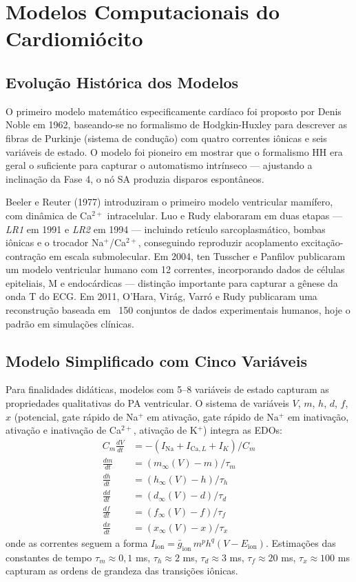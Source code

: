 \section{Modelos Computacionais do Cardiomiócito}
\label{sec:12-modelos}

\subsection{Evolução Histórica dos Modelos}
\label{sub:image12-modelos-hist}

O primeiro modelo matemático especificamente cardíaco foi proposto por
Denis Noble em 1962, baseando-se no formalismo de Hodgkin-Huxley para
descrever as fibras de Purkinje (sistema de condução) com quatro correntes
iônicas e seis variáveis de estado. O modelo foi pioneiro em mostrar que o
formalismo HH era geral o suficiente para capturar o automatismo
intrínseco --- ajustando a inclinação da Fase 4, o nó SA produzia
disparos espontâneos.

Beeler e Reuter (1977) introduziram o primeiro modelo ventricular
mamífero, com dinâmica de Ca$^{2+}$ intracelular. Luo e Rudy
elaboraram em duas etapas --- \emph{LR1} em 1991 e \emph{LR2} em 1994 ---
incluindo retículo sarcoplasmático, bombas iônicas e o trocador
Na$^+$/Ca$^{2+}$, conseguindo reproduzir acoplamento
excitação-contração em escala submolecular. Em 2004, ten Tusscher e
Panfilov publicaram um modelo ventricular humano com 12 correntes,
incorporando dados de células epiteliais, M e endocárdicas --- distinção
importante para capturar a gênese da onda T do ECG. Em 2011, O'Hara, Virág,
Varró e Rudy publicaram uma reconstrução baseada em ~150 conjuntos de
dados experimentais humanos, hoje o padrão em simulações clínicas.

\subsection{Modelo Simplificado com Cinco Variáveis}
\label{sub:image12-modelo-simples}

Para finalidades didáticas, modelos com 5--8 variáveis de estado capturam
as propriedades qualitativas do PA ventricular. O sistema de variáveis
$V$, $m$, $h$, $d$, $f$, $x$ (potencial, gate rápido de Na$^+$ em
ativação, gate rápido de Na$^+$ em inativação, ativação e inativação de
Ca$^{2+}$, ativação de K$^+$) integra as EDOs:
\begin{align}
C_m \frac{dV}{dt} &= -(I_{\mathrm{Na}} + I_{\mathrm{Ca},L} + I_K)/C_m \\
\frac{dm}{dt} &= (m_\infty(V) - m)/\tau_m \\
\frac{dh}{dt} &= (h_\infty(V) - h)/\tau_h \\
\frac{dd}{dt} &= (d_\infty(V) - d)/\tau_d \\
\frac{df}{dt} &= (f_\infty(V) - f)/\tau_f \\
\frac{dx}{dt} &= (x_\infty(V) - x)/\tau_x
\end{align}
onde as correntes seguem a forma $I_{\mathrm{ion}} = \bar{g}_{\mathrm{ion}}\, m^p h^q (V - E_{\mathrm{ion}})$.
Estimações das constantes de tempo $\tau_m \approx 0{,}1$ ms, $\tau_h \approx 2$ ms,
$\tau_d \approx 3$ ms, $\tau_f \approx 20$ ms, $\tau_x \approx 100$ ms
capturam as ordens de grandeza das transições iônicas.

